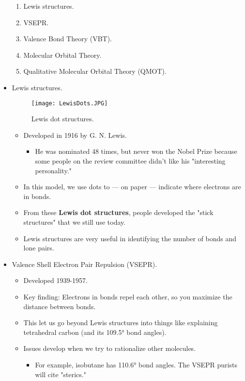 \documentclass[../notes.tex]{subfiles}
\begin{document}
\begin{itemize}
\begin{enumerate}
        \item Lewis structures.
        \item VSEPR.
        \item Valence Bond Theory (VBT).
        \item Molecular Orbital Theory.
        \item Qualitative Molecular Orbital Theory (QMOT).
    \end{enumerate}
    \item Lewis structures.
    \begin{figure}[h!]
        \centering
        \texttt{[image: LewisDots.JPG]}
        \caption{Lewis dot structures.}
        \label{fig:LewisDots}
    \end{figure}
    \pagebreak
    \begin{itemize}
        \item Developed in 1916 by G. N. Lewis.
        \begin{itemize}
            \item He was nominated 48 times, but never won the Nobel Prize because some people on the review committee didn't like his "interesting personality."
        \end{itemize}
        \item In this model, we use dots to --- on paper --- indicate where electrons are in bonds.
        \item From these \textbf{Lewis dot structures}, people developed the "stick structures" that we still use today.
        \item Lewis structures are very useful in identifying the number of bonds and lone pairs.
    \end{itemize}
    \item Valence Shell Electron Pair Repulsion (VSEPR).
    \begin{itemize}
        \item Developed 1939-1957.
        \item Key finding: Electrons in bonds repel each other, so you maximize the distance between bonds.
        \item This let us go beyond Lewis structures into things like explaining tetrahedral carbon (and its \ang{109.5} bond angles).
        \item Issues develop when we try to rationalize other molecules.
        \begin{itemize}
            \item For example, isobutane has \ang{110.6}  bond angles. The VSEPR purists will cite "sterics."

\end{itemize}
\end{itemize}
\end{itemize}
\end{document}
